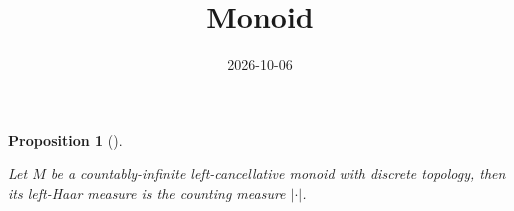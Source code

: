 \documentclass[
  british,
]{article}
\title{Monoid}
\author{}
\date{2026-10-06}
\theoremstyle{plain}
\newtheorem{proposition}{Proposition}[section]
\theoremstyle{remark}
\newcommand{\Monoid}{{M}}
\begin{document}
\maketitle


\begin{proposition}[]\protect\hypertarget{prp-HaarCounting}{}\label{prp-HaarCounting}

Let \(\Monoid\) be a countably-infinite left-cancellative monoid with
discrete topology, then its left-Haar measure is the counting measure
\(|\cdot|\).

\end{proposition}
\end{document}
